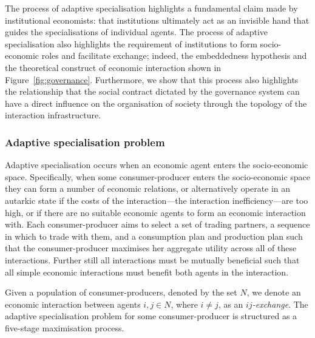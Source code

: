The process of adaptive specialisation highlights a fundamental claim made by institutional economists: that institutions ultimately act as an invisible hand that guides the specialisations of individual agents. The process of adaptive specialisation also highlights the requirement of institutions to form socio-economic roles and facilitate exchange; indeed, the embeddedness hypothesis and the theoretical construct of economic interaction shown in Figure~\ref{fig:governance}. Furthermore, we show that this process also highlights the relationship that the social contract dictated by the governance system can have a direct influence on the organisation of society through the topology of the interaction infrastructure.

\subsubsection{Adaptive specialisation problem}

Adaptive specialisation occurs when an economic agent enters the socio-economic space. Specifically, when some consumer-producer enters the socio-economic space they can form a number of economic relations, or alternatively operate in an autarkic state if the costs of the interaction---the interaction inefficiency---are too high, or if there are no suitable economic agents to form an economic interaction with. Each consumer-producer aims to select a set of trading partners, a sequence in which to trade with them, and a consumption plan and production plan such that the consumer-producer maximises her aggregate utility across all of these interactions. Further still all interactions must be mutually beneficial such that all simple economic interactions must benefit both agents in the interaction. 

Given a population of consumer-producers, denoted by the set $N$, we denote an economic interaction between agents $i,j \in N$, where $i \neq j$, as an $ij$\emph{-exchange}. The adaptive specialisation problem for some consumer-producer is structured as a five-stage maximisation process. 

